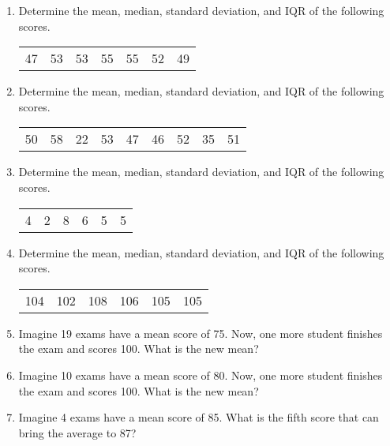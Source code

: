 \documentclass[12pt,letterpaper]{article}
\begin{document}



\newpage


\begin{enumerate}
\item Determine the mean, median, standard deviation, and IQR of the following scores.
\begin{center}
\begin{tabular}{c c c c c c c}
47 & 53 & 53 & 55 & 55 & 52 & 49
\end{tabular}
\end{center}
\vfill
\item Determine the mean, median, standard deviation, and IQR of the following scores.
\begin{center}
\begin{tabular}{c c c c c c c c c}
50 & 58 & 22 & 53 & 47 & 46 & 52 & 35 & 51
\end{tabular}
\end{center}
\vfill

\newpage
\item Determine the mean, median, standard deviation, and IQR of the following scores.
\begin{center}
\begin{tabular}{c c c c c c}
4 & 2 & 8 & 6 & 5 & 5
\end{tabular}
\end{center}
\vfill
\item Determine the mean, median, standard deviation, and IQR of the following scores.
\begin{center}
\begin{tabular}{c c c c c c}
104 & 102 & 108 & 106 & 105 & 105
\end{tabular}
\end{center}
\vfill

\newpage

\item Imagine 19 exams have a mean score of 75. Now, one more student finishes the exam and scores 100. What is the new mean?

\vfill

\item Imagine 10 exams have a mean score of 80. Now, one more student finishes the exam and scores 100. What is the new mean?

\vfill

\item Imagine 4 exams have a mean score of 85. What is the fifth score that can bring the average to 87?

\vfill



\end{enumerate}
\end{document}

